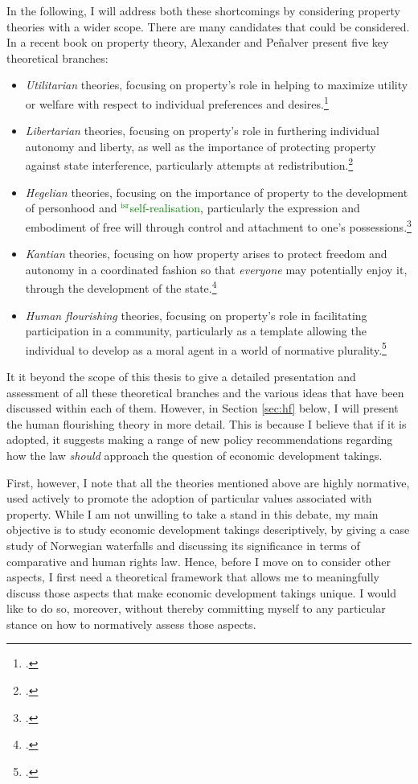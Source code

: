 \documentclass[12pt,a4paper]{book} %
\newcommand{\isr}[1]{\textcolor{green}{$^{\textrm{isr}}${#1}}}
\begin{document}
In the following, I will address both these shortcomings by considering property theories with a wider scope. There are many candidates that could be considered. In a recent book on property theory, Alexander and Pe\~{n}alver present five key theoretical branches: 
\begin{itemize}
\item {\it Utilitarian} theories, focusing on property's role in helping to maximize utility or welfare with respect to individual preferences and desires.\footnote{\cite[Chapter 1]{alexander10}.} 
\item {\it Libertarian} theories, focusing on property's role in furthering individual autonomy and liberty, as well as the importance of protecting property against state interference, particularly attempts at redistribution.\footnote{\cite[Chapter 2]{alexander10}.} 
\item {\it Hegelian} theories, focusing on the importance of property to the development of personhood and \isr{self-realisation}, particularly the expression and embodiment of free will through control and attachment to one's possessions.\footnote{\cite[Chapter 3]{alexander10}.}
\item {\it Kantian} theories, focusing on how property arises to protect freedom and autonomy in a coordinated fashion so that {\it everyone} may potentially enjoy it, through the development of the state.\footnote{\cite[Chapter 4]{alexander10}.}
\item {\it  Human flourishing} theories, focusing on property's role in facilitating participation in a community, particularly as a template allowing the individual to develop as a moral agent in a world of normative plurality.\footnote{\cite[Chapter 5]{alexander10}.}
\end{itemize}

It it beyond the scope of this thesis to give a detailed presentation and assessment of all these theoretical branches and the various ideas that have been discussed within each of them. However, in Section \ref{sec:hf} below, I will present the human flourishing theory in more detail. This is because I believe that if it is adopted, it suggests making a range of new policy recommendations regarding how the law {\it should} approach the question of economic development takings. 

First, however, I note that all the theories mentioned above are highly normative, used actively to promote the adoption of particular values associated with property. While I am not unwilling to take a stand in this debate, my main objective is to study economic development takings descriptively, by giving a case study of Norwegian waterfalls and discussing its significance in terms of comparative and human rights law. Hence, before I move on to consider other aspects, I first need a theoretical framework that allows me to meaningfully discuss those aspects that make economic development takings unique. I would like to do so, moreover, without thereby committing myself to any particular stance on how to normatively assess those aspects. 
\end{document}
